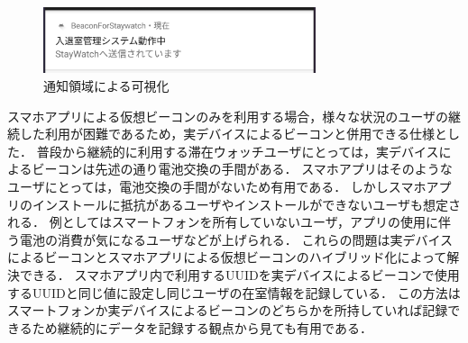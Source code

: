 \begin{figure}[tbh]
  \centering
  \includegraphics[width=8cm]{image/notify.jpg}
  \caption{通知領域による可視化}
  \label{multipleBPM}
\end{figure}



スマホアプリによる仮想ビーコンのみを利用する場合，様々な状況のユーザの継続した利用が困難であるため，実デバイスによるビーコンと併用できる仕様とした．
 普段から継続的に利用する滞在ウォッチユーザにとっては，実デバイスによるビーコンは先述の通り電池交換の手間がある．
スマホアプリはそのようなユーザにとっては，電池交換の手間がないため有用である．
 しかしスマホアプリのインストールに抵抗があるユーザやインストールができないユーザも想定される．
例としてはスマートフォンを所有していないユーザ，アプリの使用に伴う電池の消費が気になるユーザなどが上げられる．
 これらの問題は実デバイスによるビーコンとスマホアプリによる仮想ビーコンのハイブリッド化によって解決できる．
スマホアプリ内で利用するUUIDを実デバイスによるビーコンで使用するUUIDと同じ値に設定し同じユーザの在室情報を記録している．
この方法はスマートフォンか実デバイスによるビーコンのどちらかを所持していれば記録できるため継続的にデータを記録する観点から見ても有用である．

